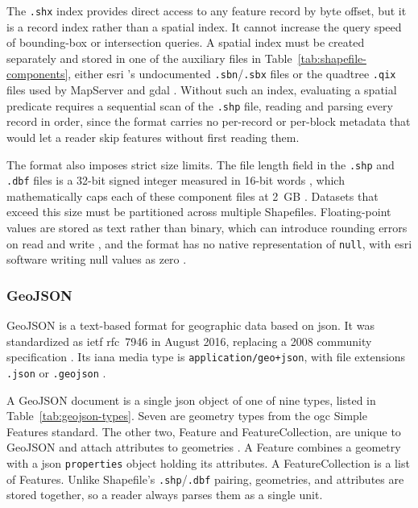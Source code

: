 The \texttt{.shx} index provides direct access to any feature record by byte offset, but it is a record index rather than a spatial index. It cannot increase the query speed of bounding-box or intersection queries. A spatial index must be created separately and stored in one of the auxiliary files in Table~\ref{tab:shapefile-components}, either \acrshort{esri} 's undocumented \texttt{.sbn}/\texttt{.sbx} files or the quadtree \texttt{.qix} files used by MapServer and \acrfull{gdal} \parencite{gdal2025_shapefile_driver}. Without such an index, evaluating a spatial predicate requires a sequential scan of the \texttt{.shp} file, reading and parsing every record in order, since the format carries no per-record or per-block metadata that would let a reader skip features without first reading them.

The format also imposes strict size limits. The file length field in the \texttt{.shp} and \texttt{.dbf} files is a 32-bit signed integer measured in 16-bit words \parencite{esri1998_shapefile_technical_description}, which mathematically caps each of these component files at 2~GB \parencite{wikipedia2025_esri_shapefile, gdal2025_shapefile_driver}. Datasets that exceed this size must be partitioned across multiple Shapefiles. Floating-point values are stored as text rather than binary, which can introduce rounding errors on read and write \parencite{esri2024_arcmap_shapefile_output}, and the format has no native representation of \texttt{null}, with \acrshort{esri} software writing null values as zero \parencite{wikipedia2025_esri_shapefile}.

\subsubsection{GeoJSON}
GeoJSON is a text-based format for geographic data based on \acrfull{json}. It was standardized as \acrshort{ietf} \acrshort{rfc}~7946 in August 2016, replacing a 2008 community specification \parencite{butler2016_rfc7946_geojson_format}. Its \acrfull{iana} media type is \texttt{application/geo+json}, with file extensions \texttt{.json} or \texttt{.geojson} \parencite{butler2016_rfc7946_geojson_format}.

A GeoJSON document is a single \acrshort{json} object of one of nine types, listed in Table~\ref{tab:geojson-types}. Seven are geometry types from the \acrfull{ogc} Simple Features standard. The other two, Feature and FeatureCollection, are unique to GeoJSON and attach attributes to geometries \parencite{butler2016_rfc7946_geojson_format}. A Feature combines a geometry with a \acrshort{json} \texttt{properties} object holding its attributes. A FeatureCollection is a list of Features. Unlike Shapefile's \texttt{.shp}/\texttt{.dbf} pairing, geometries, and attributes are stored together, so a reader always parses them as a single unit.

